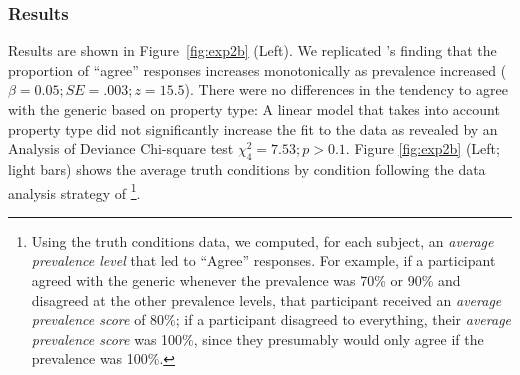 \documentclass[10pt,letterpaper]{article}
\begin{document}
%

\subsubsection{Results}



Results are shown in Figure~\ref{fig:exp2b} (Left). 
We replicated 's finding that the proportion of ``agree'' responses increases monotonically as prevalence increased ($\beta=0.05; SE = .003; z = 15.5$). 
There were no differences in the tendency to agree with the generic based on property type: 
A linear model that takes into account property type did not significantly increase the fit to the data as revealed by an Analysis of Deviance Chi-square test $\chi^2_{4}=7.53; p > 0.1$.
Figure \ref{fig:exp2b} (Left; light bars) shows the average truth conditions by condition following the data analysis strategy of \citeauthor{Cimpian2010}\footnote{ 
Using the truth conditions data, we computed, for each subject, an \emph{average prevalence level} that led to ``Agree'' responses. 
For example, if a participant agreed with the generic whenever the prevalence was 70\% or 90\% and disagreed at the other prevalence levels, that participant received an \emph{average prevalence score} of 80\%; if a participant disagreed to everything, their \emph{average prevalence score} was 100\%, since they presumably would only agree if the prevalence was 100\%.}.
\end{document}

